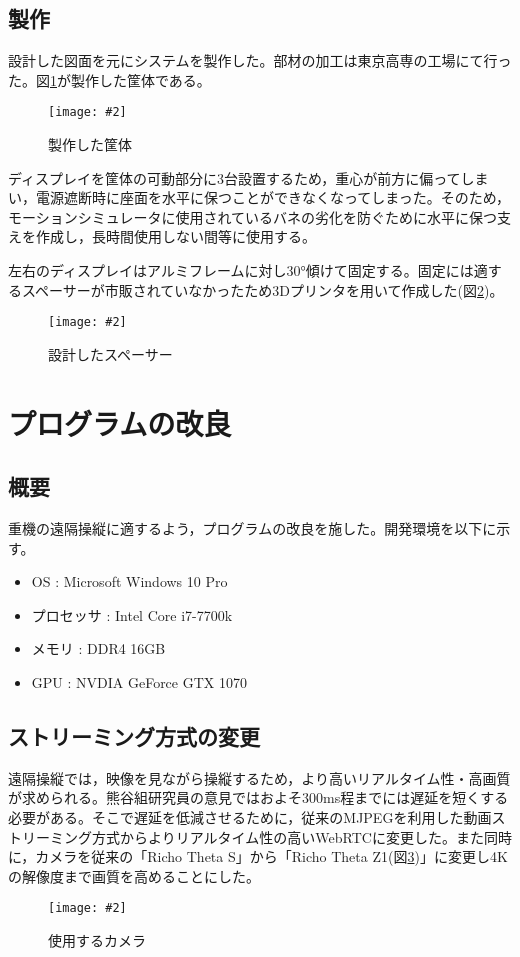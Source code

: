 \documentclass[a4paper,12pt]{jsarticle}
\newcommand{\figuref}[1]{図\ref{#1}}
\newcommand{\fig}[4][width=\textwidth]{
    \begin{figure}[!h]
    \begin{center}
    \texttt{[image: \#2]}
    \caption{#3}
    \label{#4}
    \vspace*{-1cm}
    \end{center}
    \end{figure}
}
\begin{document}
\subsection{製作}
設計した図面を元にシステムを製作した。部材の加工は東京高専の工場にて行った。\figuref{body}が製作した筐体である。
\fig[width=9cm]{image/body.jpg}{製作した筐体}{body}

ディスプレイを筐体の可動部分に3台設置するため，重心が前方に偏ってしまい，電源遮断時に座面を水平に保つことができなくなってしまった。そのため，モーションシミュレータに使用されているバネの劣化を防ぐために水平に保つ支えを作成し，長時間使用しない間等に使用する。

左右のディスプレイはアルミフレームに対し30°傾けて固定する。固定には適するスペーサーが市販されていなかったため3Dプリンタを用いて作成した(\figuref{spacer})。
\fig[width=5cm]{image/spacer.png}{設計したスペーサー}{spacer}

\clearpage

\section{プログラムの改良}
\subsection{概要}
重機の遠隔操縦に適するよう，プログラムの改良を施した。開発環境を以下に示す。
\begin{itemize}
    \item OS : Microsoft Windows 10 Pro
    \item プロセッサ : Intel Core i7-7700k
    \item メモリ : DDR4 16GB
    \item GPU : NVDIA GeForce GTX 1070
\end{itemize}

\subsection{ストリーミング方式の変更}
遠隔操縦では，映像を見ながら操縦するため，より高いリアルタイム性・高画質が求められる。熊谷組研究員の意見ではおよそ300ms程までには遅延を短くする必要がある。そこで遅延を低減させるために，従来のMJPEGを利用した動画ストリーミング方式からよりリアルタイム性の高いWebRTCに変更した。また同時に，カメラを従来の「Richo Theta S」から「Richo Theta Z1(\figuref{theta})」に変更し4Kの解像度まで画質を高めることにした。

\fig[width=7cm]{image/theta.jpg}{使用するカメラ}{theta}
\end{document}
